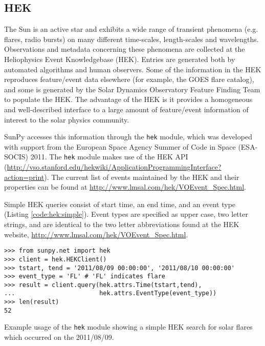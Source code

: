 \subsection{HEK}\label{ssec:hek}

The Sun is an active star and exhibits a wide range of transient phenomena (e.g. flares, 
radio bursts) on many 
different time-scales, length-scales and wavelengths. Observations and metadata 
concerning these phenomena are collected at the Heliophysics Event 
Knowledgebase (HEK).  Entries are generated both by automated algorithms and 
human observers.  Some of the information in the HEK reproduces feature/event 
data elsewhere (for example, the GOES flare catalog), and some is generated by 
the Solar Dynamics Observatory Feature Finding Team \cite{martens2012} to
populate the HEK.  The advantage of the HEK is it provides a homogeneous and 
well-described interface to a large 
amount of feature/event information of interest to the solar physics community.

SunPy accesses this information through the \texttt{hek} module, which was 
developed with support from the European Space Agency Summer of Code in 
Space (ESA-SOCIS) 2011.  The \texttt{hek} module makes use of the HEK API
(\url{http://vso.stanford.edu/hekwiki/ApplicationProgrammingInterface?action=print}).
The current list of 
events maintained by the HEK and their properties can be found at 
\url{http://www.lmsal.com/hek/VOEvent_Spec.html}.

Simple HEK queries consist of start time, an end time, and an event type 
(Listing \ref{code:hek:simple}). Event types are specified as upper case, 
two letter strings, and are 
identical to the two letter abbreviations found at the HEK website, 
\url{http://www.lmsal.com/hek/VOEvent_Spec.html}.

\begin{listing}[H]
\begin{verbatim}
>>> from sunpy.net import hek
>>> client = hek.HEKClient()
>>> tstart, tend = '2011/08/09 00:00:00', '2011/08/10 00:00:00'
>>> event_type = 'FL' # 'FL' indicates flare
>>> result = client.query(hek.attrs.Time(tstart,tend), 
...                       hek.attrs.EventType(event_type))
>>> len(result)
52
\end{verbatim}
\caption{Example usage of the \texttt{hek} module showing a simple HEK search for solar flares
which occurred on the 2011/08/09.}
\label{code:hek:simple}
\end{listing}

